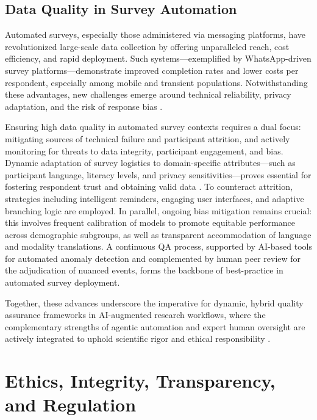 \subsection{Data Quality in Survey Automation}

Automated surveys, especially those administered via messaging platforms, have revolutionized large-scale data collection by offering unparalleled reach, cost efficiency, and rapid deployment. Such systems—exemplified by WhatsApp-driven survey platforms—demonstrate improved completion rates and lower costs per respondent, especially among mobile and transient populations. Notwithstanding these advantages, new challenges emerge around technical reliability, privacy adaptation, and the risk of response bias \cite{ref117}.

Ensuring high data quality in automated survey contexts requires a dual focus: mitigating sources of technical failure and participant attrition, and actively monitoring for threats to data integrity, participant engagement, and bias. Dynamic adaptation of survey logistics to domain-specific attributes—such as participant language, literacy levels, and privacy sensitivities—proves essential for fostering respondent trust and obtaining valid data \cite{ref117}. To counteract attrition, strategies including intelligent reminders, engaging user interfaces, and adaptive branching logic are employed. In parallel, ongoing bias mitigation remains crucial: this involves frequent calibration of models to promote equitable performance across demographic subgroups, as well as transparent accommodation of language and modality translations. A continuous QA process, supported by AI-based tools for automated anomaly detection and complemented by human peer review for the adjudication of nuanced events, forms the backbone of best-practice in automated survey deployment.

Together, these advances underscore the imperative for dynamic, hybrid quality assurance frameworks in AI-augmented research workflows, where the complementary strengths of agentic automation and expert human oversight are actively integrated to uphold scientific rigor and ethical responsibility \cite{ref88,ref89,ref91,ref92,ref93,ref96,ref97,ref98,ref108,ref112,ref113,ref114,ref115,ref117}.

\section{Ethics, Integrity, Transparency, and Regulation}

